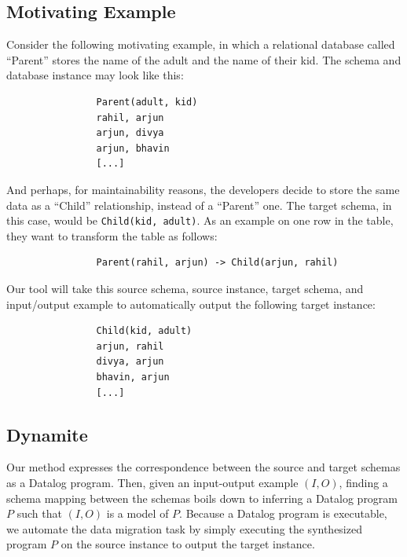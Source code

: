 \documentclass[]{article}
\begin{document}
        \subsection{Motivating Example}

            Consider the following motivating example, in which a relational database called ``Parent'' stores the name of the adult and the name of their kid. The schema and database instance may look like this:

            \begin{verbatim}
                Parent(adult, kid)
                rahil, arjun
                arjun, divya
                arjun, bhavin
                [...]
            \end{verbatim}

            And perhaps, for maintainability reasons, the developers decide to store the same data as a ``Child'' relationship, instead of a ``Parent'' one. The target schema, in this case, would be \texttt{Child(kid, adult)}. As an example on one row in the table, they want to transform the table as follows:

            \begin{verbatim}
                Parent(rahil, arjun) -> Child(arjun, rahil)
            \end{verbatim}

            Our tool will take this source schema, source instance, target schema, and input/output example to automatically output the following target instance:

            \begin{verbatim}
                Child(kid, adult)
                arjun, rahil
                divya, arjun
                bhavin, arjun
                [...]
            \end{verbatim}

        \subsection{Dynamite}

            Our method expresses the correspondence between the source and target schemas as a Datalog program. Then, given an input-output example $(I, O)$, finding a schema mapping between the schemas boils down to inferring a Datalog program $P$ such that $(I, O)$ is a model of $P$. Because a Datalog program is executable, we automate the data migration task by simply executing the synthesized program $P$ on the source instance to output the target instance. 
\end{document}
